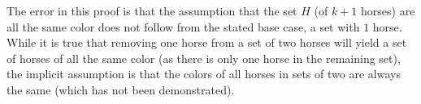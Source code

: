 The error in this proof is that the assumption that the set $ H $ (of $ k + 1 $ horses) are all the same color does not follow from the stated base case, a set with $1$ horse. While it is true that removing one horse from a set of two horses will yield a set of horses of all the same color (as there is only one horse in the remaining set), the implicit assumption is that the colors of all horses in sets of two are always the same (which has not been demonstrated).